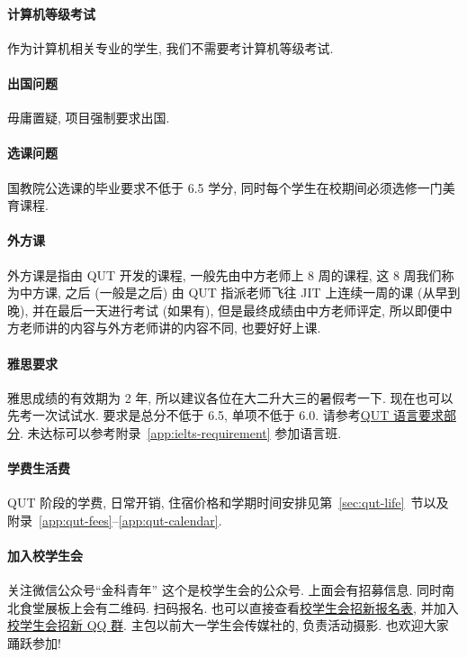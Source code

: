 \documentclass[UTF8,a4paper,12pt]{ctexart}
\newcommand{\official}[2]{\href{#1}{#2}}
\begin{document}
\paragraph{计算机等级考试} 作为计算机相关专业的学生, 我们不需要考计算机等级考试.
\paragraph{出国问题} 毋庸置疑, 项目强制要求出国.
\paragraph{选课问题} 国教院公选课的毕业要求不低于 6.5 学分, 同时每个学生在校期间必须选修一门美育课程.
\paragraph{外方课} 外方课是指由 QUT 开发的课程, 一般先由中方老师上 8 周的课程, 这 8 周我们称为中方课, 之后 (一般是之后) 由 QUT 指派老师飞往 JIT 上连续一周的课 (从早到晚), 并在最后一天进行考试 (如果有), 但是最终成绩由中方老师评定, 所以即便中方老师讲的内容与外方老师讲的内容不同, 也要好好上课.
\paragraph{雅思要求} 雅思成绩的有效期为 2 年, 所以建议各位在大二升大三的暑假考一下. 现在也可以先考一次试试水. 要求是总分不低于 6.5, 单项不低于 6.0. 请参考\official{https://www.qut.edu.au/courses/bachelor-of-information-technology-business-analysis-and-it-management\#requirements}{QUT 语言要求部分}. 未达标可以参考附录~\ref{app:ielts-requirement} 参加语言班.
\paragraph{学费生活费} QUT 阶段的学费, 日常开销, 住宿价格和学期时间安排见第~\ref{sec:qut-life}~节以及附录~\ref{app:qut-fees}--\ref{app:qut-calendar}.
\paragraph{加入校学生会} 关注微信公众号``金科青年'' 这个是校学生会的公众号. 上面会有招募信息. 同时南北食堂展板上会有二维码. 扫码报名. 也可以直接查看\official{https://v.wjx.cn/vm/er5UZFS.aspx}{校学生会招新报名表}, 并加入\official{https://qun.qq.com/universal-share/share?ac=1\&authKey=I5eYrINXEBmTFLU95VOyw7WRxbTO1EXW0e0E9Ge0ngoXddnkwDEWhcUuHadg/x6/\&busi\%5Fdata=eyJncm91cENvZGUiOiIxMTIxMDQ4NjI5IiwidG9rZW4iOiJuVkZ3YzZ0NWFnNDNWMmU2NC9kRERoTTJHYitTVDcwSVdFck9vU1YzZ0hZQ3Y1ZUM5ZUJhMzg5aUU1ejRpc1FIIiwidWluIjoiNDgxNzk2MTQzIn0=\&data=ger-r0XXoTIzhEfXo-KOAkTCkCrl6b1Kf7zOUPAkPKdlHGlOowzXERxr9dG-wpPiYuV14nhLLbcrWMEOONF18Wc66SlhTDxQrSeM-BiGA8c\&svctype=5\&tempid=h5\%5Fgroup\%5Finfo}{校学生会招新 QQ 群}. 主包以前大一学生会传媒社的, 负责活动摄影. 也欢迎大家踊跃参加!
\end{document}
